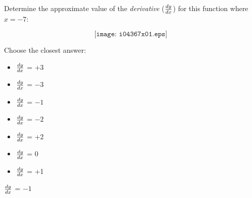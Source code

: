 

Determine the approximate value of the {\it derivative} ($dy \over dx$) for this function where $x=-7$:

$$\texttt{[image: i04367x01.eps]}$$

Choose the closest answer:

\begin{itemize}
\item{} $dy \over dx$ = +3
\vskip 10pt 
\item{} $dy \over dx$ = $-3$
\vskip 10pt 
\item{} $dy \over dx$ = $-1$
\vskip 10pt 
\item{} $dy \over dx$ = $-2$
\vskip 10pt 
\item{} $dy \over dx$ = +2
\vskip 10pt 
\item{} $dy \over dx$ = 0
\vskip 10pt 
\item{} $dy \over dx$ = +1
\end{itemize}







$dy \over dx$ = $-1$











